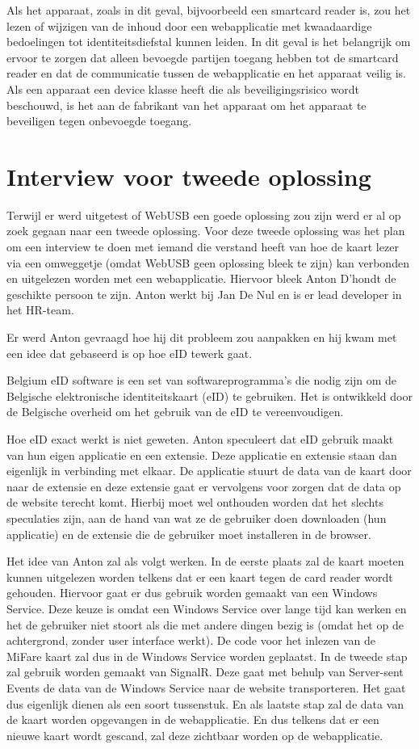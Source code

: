 Als het apparaat, zoals in dit geval, bijvoorbeeld een smartcard reader is, zou het lezen of wijzigen van de inhoud door een webapplicatie met kwaadaardige bedoelingen tot identiteitsdiefstal kunnen leiden. In dit geval is het belangrijk om ervoor te zorgen dat alleen bevoegde partijen toegang hebben tot de smartcard reader en dat de communicatie tussen de webapplicatie en het apparaat veilig is. Als een apparaat een device klasse heeft die als beveiligingsrisico wordt beschouwd, is het aan de fabrikant van het apparaat om het apparaat te beveiligen tegen onbevoegde toegang.




\section{Interview voor tweede oplossing}
Terwijl er werd uitgetest of WebUSB een goede oplossing zou zijn werd er al op zoek gegaan naar een tweede oplossing. Voor deze tweede oplossing was het plan om een interview te doen met iemand die verstand heeft van hoe de kaart lezer via een omweggetje (omdat WebUSB geen oplossing bleek te zijn) kan verbonden en uitgelezen worden met een webapplicatie. Hiervoor bleek Anton D’hondt de geschikte persoon te zijn. Anton werkt bij Jan De Nul en is er lead developer in het HR-team. 

Er werd Anton gevraagd hoe hij dit probleem zou aanpakken en hij kwam met een idee dat gebaseerd is op hoe eID tewerk gaat. 

Belgium eID software is een set van softwareprogramma's die nodig zijn om de Belgische elektronische identiteitskaart (eID) te gebruiken. Het is ontwikkeld door de Belgische overheid om het gebruik van de eID te vereenvoudigen. 

Hoe eID exact werkt is niet geweten. Anton speculeert dat eID gebruik maakt van hun eigen applicatie en een extensie. Deze applicatie en extensie staan dan eigenlijk in verbinding met elkaar. De applicatie stuurt de data van de kaart door naar de extensie en deze extensie gaat er vervolgens voor zorgen dat de data op de website terecht komt. Hierbij moet wel onthouden worden dat het slechts speculaties zijn, aan de hand van wat ze de gebruiker doen downloaden (hun applicatie) en de extensie die de gebruiker moet installeren in de browser. 

Het idee van Anton zal als volgt werken. In de eerste plaats zal de kaart moeten kunnen uitgelezen worden telkens dat er een kaart tegen de card reader wordt gehouden. Hiervoor gaat er dus gebruik worden gemaakt van een Windows Service. Deze keuze is omdat een Windows Service over lange tijd kan werken en het de gebruiker niet stoort als die met andere dingen bezig is (omdat het op de achtergrond, zonder user interface werkt). De code voor het inlezen van de MiFare kaart zal dus in de Windows Service worden geplaatst. In de tweede stap zal gebruik worden gemaakt van SignalR. Deze gaat met behulp van Server-sent Events de data van de Windows Service naar de website transporteren. Het gaat dus eigenlijk dienen als een soort tussenstuk. En als laatste stap zal de data van de kaart worden opgevangen in de webapplicatie. En dus telkens dat er een nieuwe kaart wordt gescand, zal deze zichtbaar worden op de webapplicatie. 

